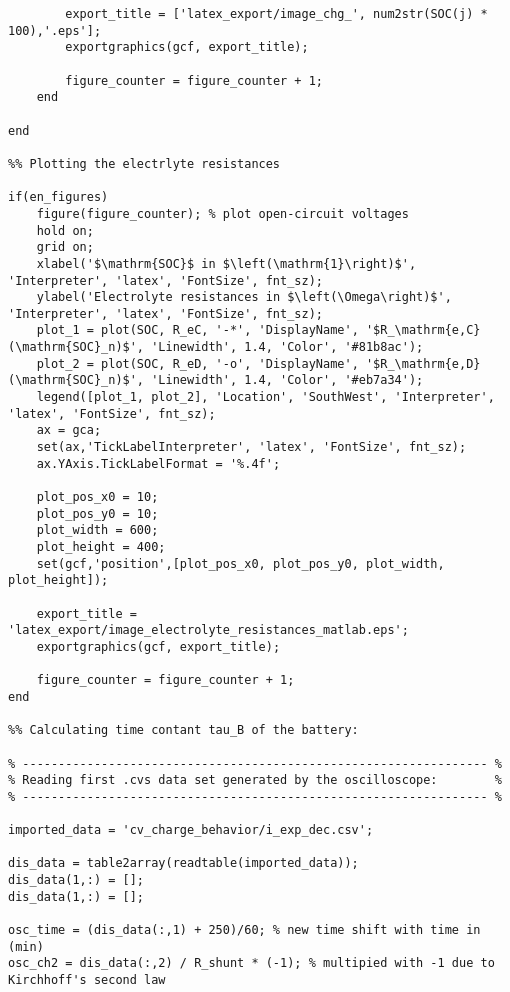 \begin{lstlisting}
        export_title = ['latex_export/image_chg_', num2str(SOC(j) * 100),'.eps'];
        exportgraphics(gcf, export_title);
        
        figure_counter = figure_counter + 1;
    end
    
end

%% Plotting the electrlyte resistances

if(en_figures)
    figure(figure_counter); % plot open-circuit voltages
    hold on;
    grid on;
    xlabel('$\mathrm{SOC}$ in $\left(\mathrm{1}\right)$', 'Interpreter', 'latex', 'FontSize', fnt_sz);
    ylabel('Electrolyte resistances in $\left(\Omega\right)$', 'Interpreter', 'latex', 'FontSize', fnt_sz);
    plot_1 = plot(SOC, R_eC, '-*', 'DisplayName', '$R_\mathrm{e,C}(\mathrm{SOC}_n)$', 'Linewidth', 1.4, 'Color', '#81b8ac');
    plot_2 = plot(SOC, R_eD, '-o', 'DisplayName', '$R_\mathrm{e,D}(\mathrm{SOC}_n)$', 'Linewidth', 1.4, 'Color', '#eb7a34');
    legend([plot_1, plot_2], 'Location', 'SouthWest', 'Interpreter', 'latex', 'FontSize', fnt_sz);
    ax = gca;
    set(ax,'TickLabelInterpreter', 'latex', 'FontSize', fnt_sz);
    ax.YAxis.TickLabelFormat = '%.4f';
    
    plot_pos_x0 = 10;
    plot_pos_y0 = 10;
    plot_width = 600;
    plot_height = 400;
    set(gcf,'position',[plot_pos_x0, plot_pos_y0, plot_width, plot_height]);
    
    export_title = 'latex_export/image_electrolyte_resistances_matlab.eps';
    exportgraphics(gcf, export_title);
    
    figure_counter = figure_counter + 1;
end

%% Calculating time contant tau_B of the battery:

% ----------------------------------------------------------------- %
% Reading first .cvs data set generated by the oscilloscope:        %
% ----------------------------------------------------------------- %

imported_data = 'cv_charge_behavior/i_exp_dec.csv';

dis_data = table2array(readtable(imported_data));                         
dis_data(1,:) = [];                                                       
dis_data(1,:) = [];                                                       

osc_time = (dis_data(:,1) + 250)/60; % new time shift with time in (min)                                                                                   
osc_ch2 = dis_data(:,2) / R_shunt * (-1); % multipied with -1 due to Kirchhoff's second law  


\end{lstlisting}
